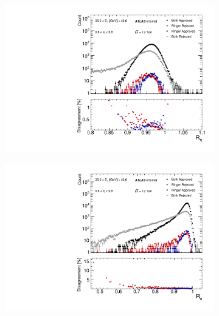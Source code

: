 \begin{figure}[h!]
\centering
\begin{subfigure}[c]{.49\textwidth}
\centering
\includegraphics[width=\textwidth]{sections/05_analysis/figures/quadrant_plots/HLT_e28_lhtight_nod0_noringer_ivarloose_HLT_e28_lhtight_nod0_ivarloose_reta_et4_eta1.pdf}
\caption{}
\label{fig:quadrant_calo_variables_30GeV_eta}
\end{subfigure}
\begin{subfigure}[c]{.49\textwidth}
\centering
\includegraphics[width=\textwidth]{sections/05_analysis/figures/quadrant_plots/HLT_e28_lhtight_nod0_noringer_ivarloose_HLT_e28_lhtight_nod0_ivarloose_rphi_et4_eta1.pdf}
\caption{}
\end{subfigure} 

\end{figure}
